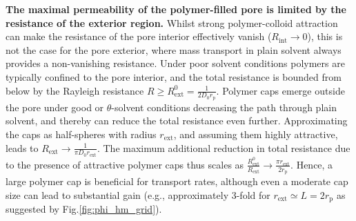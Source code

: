 \documentclass[12pt, a4paper]{article}
\begin{document}

\textbf{The maximal permeability of the polymer-filled pore is limited by the resistance of the exterior region.}
Whilst strong  polymer-colloid attraction can make the resistance of the pore interior effectively vanish ($R_{\text{int}} \to 0$), this is not the case for the pore exterior, where mass transport in plain solvent always provides a non-vanishing resistance.
Under poor solvent conditions  polymers are typically confined to the pore interior, and the total resistance is bounded from below by the Rayleigh resistance  $R \geq R_{\text{ext}}^{0} = \frac{1}{2 D_0 r_{\text{p}}}$.
Polymer caps emerge outside the pore under good or $\theta$-solvent conditions decreasing the path through plain solvent, and thereby can reduce the total resistance even further. Approximating the caps as half-spheres with radius $r_{\text{ext}}$, and assuming them highly attractive, leads to $R_{\text{ext}} \to \frac{1}{ \pi D_0 r_{\text{ext}}}$.
The maximum additional reduction in total resistance due to the presence of attractive polymer caps thus scales as $\frac{R_{\text{ext}}^{0}}{R_{\text{ext}}} \to \frac{\pi r_{\text{ext}}}{2 r_{\text{p}}}$.
Hence, a large polymer cap is beneficial for transport rates, although even a moderate cap size can lead to substantial gain (e.g., approximately 3-fold for $r_{\text{ext}}\simeq L = 2r_{\text{p}}$ as suggested by Fig.\ref{fig:phi_hm_grid}). 

\end{document}
